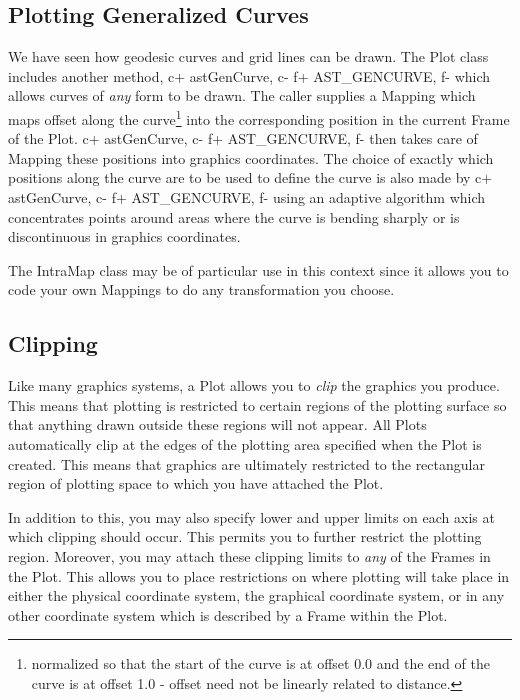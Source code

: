 \documentclass[twoside,11pt]{article}
\begin{document}
\subsection{\label{ss:plottinggeneralizedcurves}Plotting Generalized Curves}
We have seen how geodesic curves and grid lines can be drawn. The Plot
class includes another method,
c+
astGenCurve,
c- 
f+
AST\_GENCURVE,
f-
which allows curves of {\em any} form to be drawn. The caller supplies a
Mapping which maps offset along the curve\footnote{normalized so that the
start of the curve is at offset 0.0 and the end of the curve is at offset
1.0 - offset need not be linearly related to distance.} into the
corresponding position in the current Frame of the Plot.
c+
astGenCurve,
c- 
f+
AST\_GENCURVE,
f-
then takes care of Mapping these positions into graphics coordinates. The
choice of exactly which positions along the curve are to be used to
define the curve is also made by
c+
astGenCurve,
c- 
f+
AST\_GENCURVE,
f-
using an adaptive algorithm which concentrates points around areas where
the curve is bending sharply or is discontinuous in graphics coordinates.

The IntraMap class may be of particular use in this context since it allows 
you to code your own Mappings to do any transformation you choose.


\subsection{\label{ss:clipping}Clipping}

Like many graphics systems, a Plot allows you to {\em{clip}} the graphics
you produce. This means that plotting is restricted to certain regions
of the plotting surface so that anything drawn outside these regions
will not appear.  All Plots automatically clip at the edges of the
plotting area specified when the Plot is created. This means that
graphics are ultimately restricted to the rectangular region of
plotting space to which you have attached the Plot.

In addition to this, you may also specify lower and upper limits on
each axis at which clipping should occur. This permits you to further
restrict the plotting region. Moreover, you may attach these clipping
limits to {\em{any}} of the Frames in the Plot. This allows you to
place restrictions on where plotting will take place in either the
physical coordinate system, the graphical coordinate system, or in any
other coordinate system which is described by a Frame within the Plot.
\end{document}
